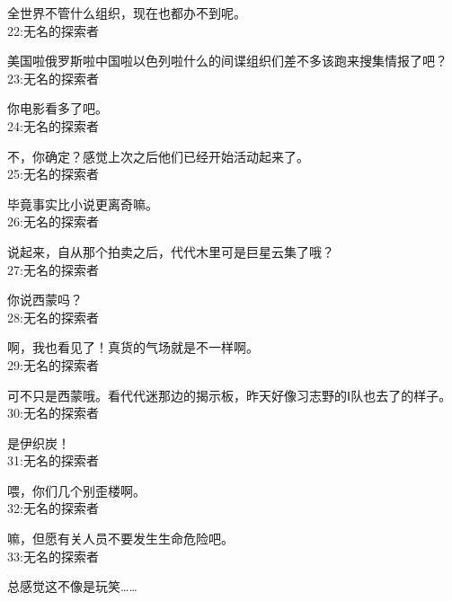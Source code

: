 全世界不管什么组织，现在也都办不到呢。\\

22:无名的探索者

美国啦俄罗斯啦中国啦以色列啦什么的间谍组织们差不多该跑来搜集情报了吧？\\

23:无名的探索者

你电影看多了吧。\\

24:无名的探索者

不，你确定？感觉上次之后他们已经开始活动起来了。\\

25:无名的探索者

毕竟事实比小说更离奇嘛。\\

26:无名的探索者

说起来，自从那个拍卖之后，代代木里可是巨星云集了哦？\\

27:无名的探索者

你说西蒙吗？\\

28:无名的探索者

啊，我也看见了！真货的气场就是不一样啊。\\

29:无名的探索者

可不只是西蒙哦。看代代迷那边的揭示板，昨天好像习志野的Ⅰ队也去了的样子。\\

30:无名的探索者

是伊织炭！\\

31:无名的探索者

喂，你们几个别歪楼啊。\\

32:无名的探索者

嘛，但愿有关人员不要发生生命危险吧。\\

33:无名的探索者

总感觉这不像是玩笑……\\
